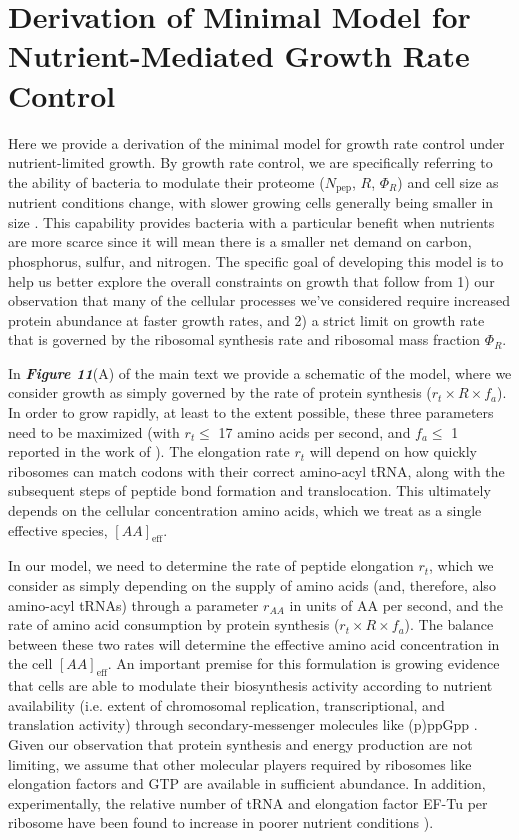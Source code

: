 \section{Derivation of Minimal Model for Nutrient-Mediated Growth Rate Control}
\label{sec:SI_model}
Here we provide a derivation of the minimal model for growth rate control under
nutrient-limited growth. By growth rate control, we are specifically referring
to the ability of bacteria to modulate their proteome ($N_\text{pep}$, $R$,
$\Phi_R$) and cell size as nutrient conditions change, with slower growing cells
generally being smaller in size \citep{ojkic2019}. This capability provides
bacteria with  a particular benefit when nutrients are more scarce since it will
mean there is a  smaller net demand on carbon, phosphorus, sulfur, and nitrogen.
The specific goal  of developing this model is to help us better explore the
overall constraints on  growth that follow from 1) our observation that many  of
the cellular processes we've considered require increased protein abundance at
faster growth rates, and 2) a strict limit on growth rate that is
governed by the ribosomal synthesis rate and ribosomal mass fraction $\Phi_R$.

In \textbf{\textit{Figure 11}}(A) of the main text we provide a schematic of the
model, where we consider growth as simply governed by the rate of protein
synthesis ($r_t \times R \times f_a$). In order to grow rapidly, at least to the
extent possible, these three parameters need to be maximized (with $r_t \leq$ 17
amino acids per second, and $f_a \leq$ 1 reported in the work of
\cite{dai2016}). The elongation rate $r_t$ will depend on how quickly
ribosomes can match codons with their correct amino-acyl tRNA, along with the
subsequent steps of peptide bond formation and translocation. This ultimately
depends on the cellular concentration amino acids, which we treat as a single
effective species, $[AA]_\text{eff}$.

In our model, we need to determine the rate of peptide elongation $r_t$, which we
consider as simply depending on the supply of amino acids (and,
therefore, also amino-acyl tRNAs) through a parameter $r_{AA}$ in units of AA
per second, and the rate of amino acid consumption by protein synthesis ($r_t
\times R \times f_a$). The balance between these two rates will determine the
effective amino acid concentration in the cell $[AA]_\text{eff}$. An important
premise for this formulation is growing evidence that cells are able to modulate
their biosynthesis activity according to nutrient availability (i.e. extent of
chromosomal replication, transcriptional, and translation activity) through
secondary-messenger molecules like (p)ppGpp \citep{hauryliuk2015, zhu2019,
kraemer2019, fernandezcoll2020, Buke2020}. Given our observation that protein
synthesis and energy production are not limiting, we assume that other molecular
players required by ribosomes like elongation factors and GTP are available in
sufficient abundance. In addition, experimentally, the relative number of tRNA
and elongation factor EF-Tu per ribosome have been found to increase in poorer
nutrient conditions \cite{pedersen1978, dong1996, klumpp2013}).

